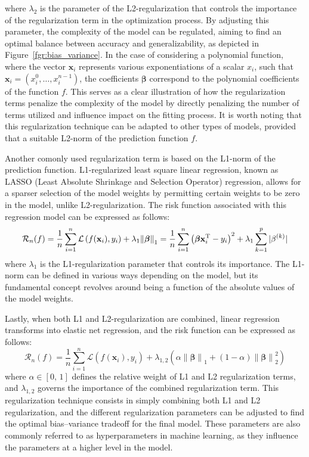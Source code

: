 \documentclass[main]{subfiles}
\begin{document}
where $\lambda_2$ is the parameter of the L2-regularization that controls the importance of the regularization term in the optimization process. By adjusting this parameter, the complexity of the model can be regulated, aiming to find an optimal balance between accuracy and generalizability, as depicted in Figure~\ref{fgr:bias_variance}. In the case of considering a polynomial function, where the vector $\mathbf{x}_i$ represents various exponentiations of a scalar $x_i$, such that $\mathbf{x}_i=\left(x_i^0,\ldots,x_i^{n-1}\right)$, the coefficients $\boldsymbol{\beta}$ correspond to the polynomial coefficients of the function $f$. This serves as a clear illustration of how the regularization terms penalize the complexity of the model by directly penalizing the number of terms utilized and influence impact on the fitting process. It is worth noting that this regularization technique can be adapted to other types of models, provided that a suitable L2-norm of the prediction function $f$.

Another comonly used regularization term is based on the L1-norm of the prediction function. L1-regularized least square linear regression, known as LASSO (Least Absolute Shrinkage and Selection Operator) regression, allows for a sparser selection of the model weights by permitting certain weights to be zero in the model, unlike L2-regularization. The risk function associated with this regression model can be expressed as follows:
\begin{equation}\label{eq:L1_reg}
  \mathcal{R}_n(f) = \frac{1}{n}\sum_{i=1}^n \mathcal{L}\left(f(\mathbf{x}_i),y_i\right) + \lambda_1{\lVert \boldsymbol{\beta} \rVert}_1 = \frac{1}{n}\sum_{i=1}^n {\left(\boldsymbol{\beta}\mathbf{x}_i^{\text{T}}-y_i\right)}^2 + \lambda_1 \sum_{k=1}^p |\beta^{(k)}|
\end{equation}
where $\lambda_1$ is the L1-regularization parameter that controls its importance. The L1-norm can be defined in various ways depending on the model, but its fundamental concept revolves around being a function of the absolute values of the model weights.

Lastly, when both L1 and L2-regularization are combined, linear regression transforms into elastic net regression, and the risk function can be expressed as follows:
\begin{equation}\label{eq:elasticnet_reg}
  \mathcal{R}_n(f) = \frac{1}{n}\sum_{i=1}^n \mathcal{L}\left(f(\mathbf{x}_i),y_i\right) + \lambda_{1,2} \left({\alpha \lVert \boldsymbol{\beta} \rVert }_1 + (1-\alpha) {\lVert \boldsymbol{\beta} \rVert}_2^2\right)
\end{equation}
where $\alpha\in[0,\,1]$ defines the relative weight of L1 and L2 regularization terms, and $\lambda_{1,2}$ governs the importance of the combined regularization term. This regularization technique consists in simply combining both L1 and L2 regularization, and the different regularization parameters can be adjusted to find the optimal bias--variance tradeoff for the final model. These parameters are also commonly referred to as hyperparameters in machine learning, as they influence the parameters at a higher level in the model.
\end{document}

